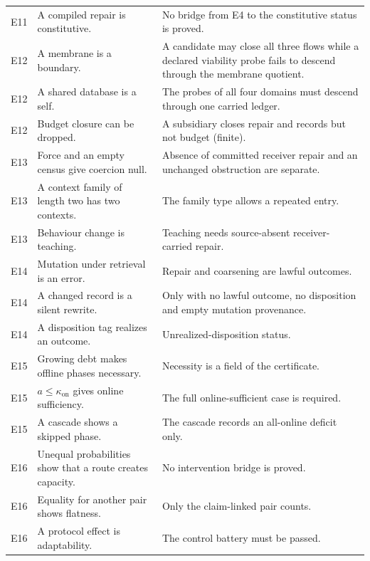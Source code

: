 {\begin{longtable}{@{}l>{\raggedright\arraybackslash}p{5.2cm}>{\raggedright\arraybackslash}p{8.0cm}@{}}
E11 & A compiled repair is constitutive. & No bridge from E4 to the constitutive status is proved. \\
E12 & A membrane is a boundary. & A candidate may close all three flows while a declared viability probe
fails to descend through the membrane quotient. \\
E12 & A shared database is a self. & The probes of all four domains must descend through one carried ledger. \\
E12 & Budget closure can be dropped. & A subsidiary closes repair and records but not budget (finite). \\
E13 & Force and an empty census give coercion null. & Absence of committed receiver repair and an
unchanged obstruction are separate. \\
E13 & A context family of length two has two contexts. & The family type allows a repeated entry. \\
E13 & Behaviour change is teaching. & Teaching needs source-absent receiver-carried repair. \\
E14 & Mutation under retrieval is an error. & Repair and coarsening are lawful outcomes. \\
E14 & A changed record is a silent rewrite. & Only with no lawful outcome, no disposition and empty
mutation provenance. \\
E14 & A disposition tag realizes an outcome. & Unrealized-disposition status. \\
E15 & Growing debt makes offline phases necessary. & Necessity is a field of the certificate. \\
E15 & $a \le \kappa_{\mathrm{on}}$ gives online sufficiency. & The full online-sufficient case is
required. \\
E15 & A cascade shows a skipped phase. & The cascade records an all-online deficit only. \\
E16 & Unequal probabilities show that a route creates capacity. & No intervention bridge is proved. \\
E16 & Equality for another pair shows flatness. & Only the claim-linked pair counts. \\
E16 & A protocol effect is adaptability. & The control battery must be passed. \\
\end{longtable}
}

